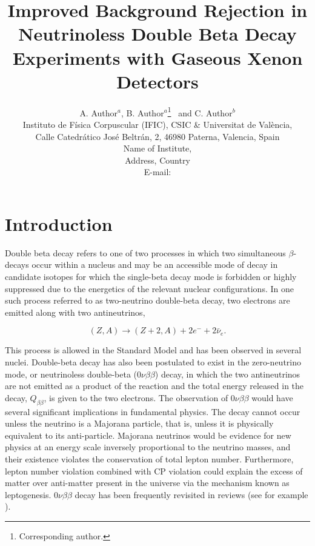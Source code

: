 \documentclass{JINST}
\title{Improved Background Rejection in Neutrinoless Double Beta Decay Experiments with Gaseous Xenon Detectors}
\author{A. Author$^a$,
B. Author$^a$\thanks{Corresponding author.}~
and C. Author$^b$\\
\llap{$^a$}Instituto de F\'isica Corpuscular (IFIC), CSIC \& Universitat de Val\`encia,\\ 
Calle Catedr\'atico Jos\'e Beltr\'an, 2, 46980 Paterna, Valencia, Spain\\
\llap{$^b$}Name of Institute,\\
  Address, Country\\
E-mail: \email{CorrespondingAuthor@email.com}}
\begin{document}
\section{Introduction}\label{sec:intro}
Double beta decay refers to one of two processes in which two simultaneous $\beta$-decays occur within a nucleus and
may be an accessible mode of decay in candidate isotopes for which the single-beta decay mode is forbidden or highly
suppressed due to the energetics of the relevant nuclear configurations.  In one such process referred to as two-neutrino
double-beta decay, two electrons are emitted along with two antineutrinos,

\begin{equation}
 (Z,A) \rightarrow (Z+2,A) + 2e^{-} + 2\bar{\nu}_{e}.
\end{equation}

This process is allowed in the Standard Model and has been observed in several nuclei.  Double-beta decay has also been
postulated to exist in the zero-neutrino mode, or neutrinoless double-beta ($0\nu\beta\beta$) decay, in which the two 
antineutrinos are not emitted as a product of the reaction and the total energy released in the decay, $Q_{\beta\beta}$, is 
given to the two electrons.  The observation of $0\nu\beta\beta$ would have several significant implications
in fundamental physics.  The decay cannot occur unless the neutrino is a Majorana particle, that is, unless it is
physically equivalent to its anti-particle.  Majorana neutrinos would be evidence for new physics at an energy scale
inversely proportional to the neutrino masses, and their existence violates the conservation of total lepton number. 
Furthermore, lepton number violation combined with CP violation could explain the excess of matter over anti-matter
present in the universe via the mechanism known as leptogenesis.  $0\nu\beta\beta$ decay has been frequently revisited
in reviews (see for example \cite{Cadenas_2012, Bilenky_2010, Elliot_2012}).
\end{document}
